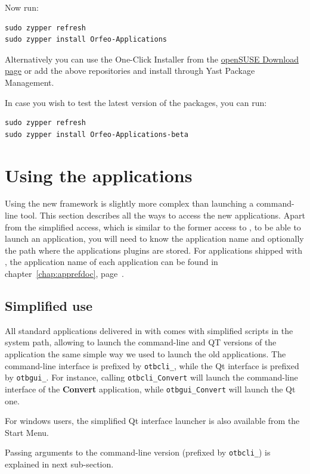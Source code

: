 Now run:
\begin{verbatim}
sudo zypper refresh
sudo zypper install Orfeo-Applications
\end{verbatim}

Alternatively you can use the One-Click Installer from the
\href{http://software.opensuse.org/search?q=Orfeo&baseproject=openSUSE\%3A11.4&lang=en&include_home=true&exclude_debug=true}{openSUSE
  Download page} or add the above repositories and install through
Yast Package Management.

In case you wish to test the latest version of the packages, you can run:
\begin{verbatim}
sudo zypper refresh
sudo zypper install Orfeo-Applications-beta
\end{verbatim}


\section{Using the applications}\label{sec:usingapps}

Using the new \app framework is slightly more complex than launching a
command-line tool. This section describes all the ways to access the
new applications. Apart from the simplified access, which is similar
to the former access to \app, to be able to launch an application, you
will need to know the application name and optionally the path where the
applications plugins are stored. For applications shipped with \otb,
the application name of each application can be found in
chapter~\ref{chap:apprefdoc}, page~\pageref{chap:apprefdoc}.

\subsection{Simplified use}

All standard applications delivered in with \otb comes with simplified
scripts in the system path, allowing to launch the command-line and QT
versions of the application the same simple way we used to launch the
old applications. The command-line interface is prefixed by
\verb?otbcli_?, while the Qt interface is prefixed by
\verb?otbgui_?. For instance, calling \verb?otbcli_Convert? will
launch the command-line interface of the \textbf{Convert} application,
while \verb?otbgui_Convert? will launch the Qt one.

For windows users, the simplified Qt interface launcher is also
available from the Start Menu.

Passing arguments to the command-line version (prefixed by
\verb?otbcli_?) is explained in next sub-section.

